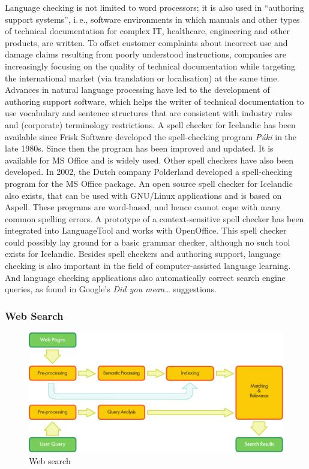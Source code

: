 \documentclass{../../metanetpaper}
\begin{document}
\begin{multicols}{2}
Language checking is not limited to word processors; it is also used in “authoring support systems”, i.\,e., software environments in which manuals and other types of technical documentation for complex IT, healthcare, engineering and other products, are written. To offset customer complaints about incorrect use and damage claims resulting from poorly understood instructions, companies are increasingly focusing on the quality of technical documentation while targeting the international market (via translation or localisation) at the same time. Advances in natural language processing have led to the development of authoring support software, which helps the writer of technical documentation to use vocabulary and sentence structures that are consistent with industry rules and (corporate) terminology restrictions.
A spell checker for Icelandic has been available since Frisk Software developed the spell-checking program \textit{Púki} in the late 1980s. Since then the program has been improved and updated. It is available for MS Office and is widely used. Other spell checkers have also been developed. In 2002, the Dutch company Polderland developed a spell-checking program for the MS Office package. An open source spell checker for Icelandic also exists, that can be used with GNU/Linux applications and is based on Aspell. These programs are word-based, and hence cannot cope with many common spelling errors. A prototype of a context-sensitive spell checker has been integrated into LanguageTool \cite{lto1} and works with OpenOffice. This spell checker could possibly lay ground for a basic grammar checker, although no such tool exists for Icelandic.
Besides spell checkers and authoring support, language checking is also important in the field of computer-assisted language learning. And language checking applications also automatically correct search engine queries, as found in Google's \textit{Did you mean…} suggestions.

\subsubsection{Web Search}

\begin{figure}[htb]
  \center
  \includegraphics[width=\textwidth]{../_media/english/web_search_architecture}
  \caption{Web search}
  \label{fig:websearcharch_en}
 \end{figure}


\end{multicols}
\end{document}
